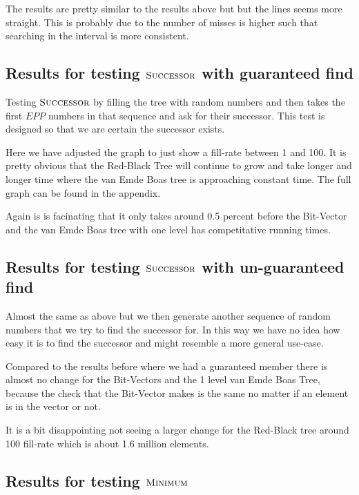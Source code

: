 \documentclass[oneside,11pt,openright]{report}
\newcommand{\Minimum}{\textsc{Minimum}}
\newcommand{\Successor}{\textsc{Successor}}
\begin{document}


The results are pretty similar to the results above but but the lines seems more straight. This is probably due to the number of misses is higher such that searching in the interval is more consistent.

\subsection{Results for testing $\Successor$ with guaranteed find}

Testing $\Successor$ by filling the tree with random numbers and then takes the first $EPP$ numbers in that sequence and ask for their successor. This test is designed so that we are certain the successor exists.



Here we have adjusted the graph to just show a fill-rate between 1 and 100. It is pretty obvious that the Red-Black Tree will continue to grow and take longer and longer time where the van Emde Boas tree is approaching constant time. The full graph can be found in the appendix.

Again is is facinating that it only takes around 0.5 percent before the Bit-Vector and the van Emde Boas tree with one level has competitative running times.

\subsection{Results for testing $\Successor$ with un-guaranteed find}

Almost the same as above but we then generate another sequence of random numbers that we try to find the successor for. In this way we have no idea how easy it is to find the successor and might resemble a more general use-case.




Compared to the results before where we had a guaranteed member there is almost no change for the Bit-Vectors and the 1 level van Emde Boas Tree, because the check that the Bit-Vector makes is the same no matter if an element is in the vector or not. 

It is a bit disappointing not seeing a larger change for the Red-Black tree around 100 fill-rate which is about 1.6 million elements.

\subsection{Results for testing $\Minimum$}
\end{document}

